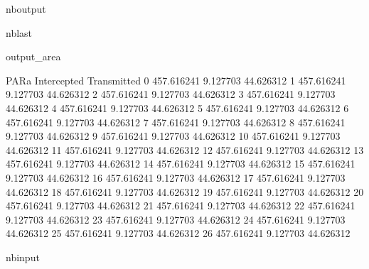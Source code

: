 \documentclass[letterpaper,10pt,english]{sphinxmanual}
\begin{document}
\begin{sphinxuseclass}{nboutput}
\begin{sphinxuseclass}{nblast}
{\begin{sphinxuseclass}{output_area}
\begin{sphinxuseclass}{}
\begin{sphinxVerbatim}[commandchars=\\\{\}]
          PARa  Intercepted  Transmitted
0   457.616241     9.127703    44.626312
1   457.616241     9.127703    44.626312
2   457.616241     9.127703    44.626312
3   457.616241     9.127703    44.626312
4   457.616241     9.127703    44.626312
5   457.616241     9.127703    44.626312
6   457.616241     9.127703    44.626312
7   457.616241     9.127703    44.626312
8   457.616241     9.127703    44.626312
9   457.616241     9.127703    44.626312
10  457.616241     9.127703    44.626312
11  457.616241     9.127703    44.626312
12  457.616241     9.127703    44.626312
13  457.616241     9.127703    44.626312
14  457.616241     9.127703    44.626312
15  457.616241     9.127703    44.626312
16  457.616241     9.127703    44.626312
17  457.616241     9.127703    44.626312
18  457.616241     9.127703    44.626312
19  457.616241     9.127703    44.626312
20  457.616241     9.127703    44.626312
21  457.616241     9.127703    44.626312
22  457.616241     9.127703    44.626312
23  457.616241     9.127703    44.626312
24  457.616241     9.127703    44.626312
25  457.616241     9.127703    44.626312
26  457.616241     9.127703    44.626312
\end{sphinxVerbatim}



\end{sphinxuseclass}
\end{sphinxuseclass}
}

\end{sphinxuseclass}
\end{sphinxuseclass}
\begin{sphinxuseclass}{nbinput}
{
\begin{sphinxVerbatim}[commandchars=\\\{\}]
\llap{\color{nbsphinxin}[11]:\,\hspace{\fboxrule}\hspace{\fboxsep}}
\end{sphinxVerbatim}
}

\end{sphinxuseclass}
\end{document}
